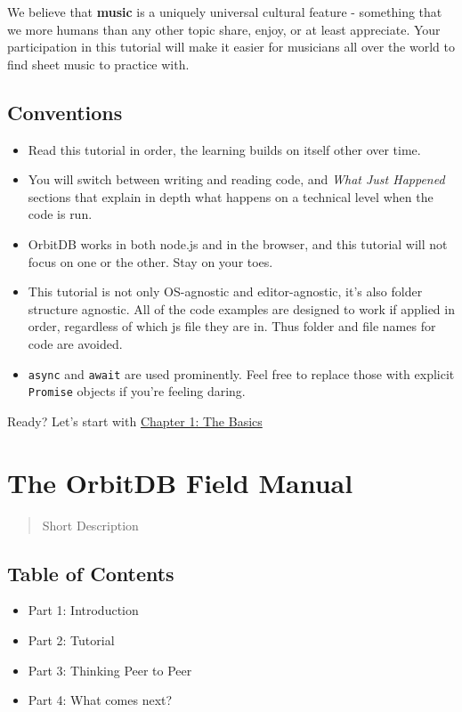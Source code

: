 We believe that \textbf{music} is a uniquely universal cultural feature
- something that we more humans than any other topic share, enjoy, or at
least appreciate. Your participation in this tutorial will make it
easier for musicians all over the world to find sheet music to practice
with.

\subsection{Conventions}\label{conventions}

\begin{itemize}
\tightlist
\item
  Read this tutorial in order, the learning builds on itself other over
  time.
\item
  You will switch between writing and reading code, and \emph{What Just
  Happened} sections that explain in depth what happens on a technical
  level when the code is run.
\item
  OrbitDB works in both node.js and in the browser, and this tutorial
  will not focus on one or the other. Stay on your toes.
\item
  This tutorial is not only OS-agnostic and editor-agnostic, it's also
  folder structure agnostic. All of the code examples are designed to
  work if applied in order, regardless of which js file they are in.
  Thus folder and file names for code are avoided.
\item
  \texttt{async} and \texttt{await} are used prominently. Feel free to
  replace those with explicit \texttt{Promise} objects if you're feeling
  daring.
\end{itemize}

Ready? Let's start with \href{./01_Basics.md}{Chapter 1: The Basics}

\section{The OrbitDB Field Manual}\label{the-orbitdb-field-manual-1}

\begin{quote}
Short Description
\end{quote}

\subsection{Table of Contents}\label{table-of-contents}

\begin{itemize}
\tightlist
\item
  Part 1: Introduction
\item
  Part 2: Tutorial
\item
  Part 3: Thinking Peer to Peer
\item
  Part 4: What comes next?
\end{itemize}

